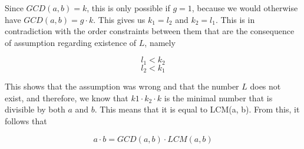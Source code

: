 \documentclass{article}
\begin{document}
Since $GCD(a, b) = k$, this is only possible if $g = 1$, because we would otherwise have $GCD(a, b) = g \cdot k$. This gives us $k_1 = l_2$ and $k_2 = l_1$. This is in contradiction with the order constraints between them that are the consequence of assumption regarding existence of $L$, namely

\[ l_1 < k_2 \]
\[ l_2 < k_1 \]

This shows that the assumption was wrong and that the number $L$ does not exist, and therefore, we know that $k1 \cdot k_2 \cdot k$ is the minimal number that is divisible by both $a$ and $b$. This means that it is equal to LCM(a, b). From this, it follows that

\[ a \cdot b = GCD(a, b) \cdot LCM(a, b) \]

\rightline{$\blacksquare$}
\end{document}
